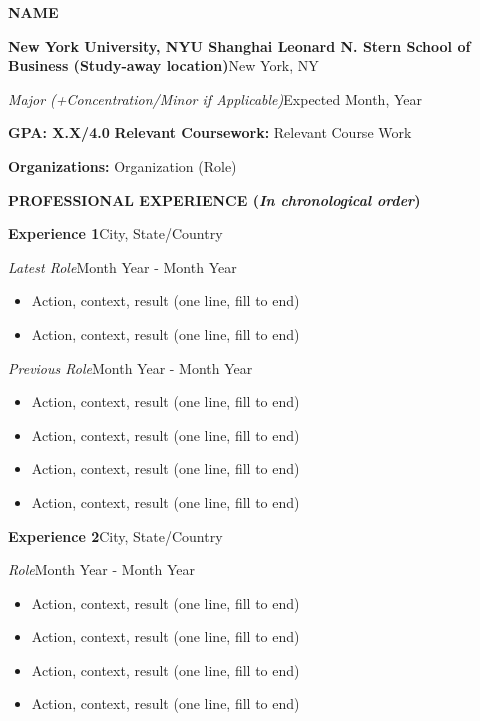 \documentclass[letterpaper]{article}
\newcommand{\bplus}{\par\vspace{2pt}}
\newcommand{\bighead}[1]{\par\vspace{6pt}{\fontsize{11.04}{12}\selectfont\textbf{#1}}\par}
\newcommand{\head}[1]{\par\vspace{4pt}\textbf{#1}\par}
\newcommand{\entry}[2]{\par\textbf{#1}\hfill #2\par}
\newcommand{\entryit}[2]{\par\textit{#1}\hfill #2\par}
\newenvironment{bull}{\begin{itemize}[leftmargin=13.6pt, itemsep=0pt, topsep=0pt, parsep=0pt, partopsep=0pt, label=\textbullet\,]}{\end{itemize}}
\begin{document}
{\centering
  {\fontsize{21.96}{22}\selectfont\textbf{NAME}}\par
  \par
}

\bighead{EDUCATION}
\entry{New York University, NYU Shanghai \textbar{} Leonard N. Stern School of Business (Study-away location)}{New York, NY}
\entryit{Major (+Concentration/Minor if Applicable)}{Expected Month, Year}
\par\textbf{GPA: X.X/4.0} \textbar{} \textbf{Relevant Coursework:} Relevant Course Work\par
\par\textbf{Organizations:} Organization (Role)\par

\head{\textbf{PROFESSIONAL EXPERIENCE} (\textit{In chronological order})}
\entry{Experience 1}{City, State/Country}
\entryit{Latest Role}{Month Year - Month Year}
\begin{bull}
  \item Action, context, result (one line, fill to end)
  \item Action, context, result (one line, fill to end)
\end{bull}
\entryit{Previous Role}{Month Year - Month Year}
\begin{bull}
  \item Action, context, result (one line, fill to end)
  \item Action, context, result (one line, fill to end)
  \bplus
  \item Action, context, result (one line, fill to end)
  \item Action, context, result (one line, fill to end)
\end{bull}

\entry{Experience 2}{City, State/Country}
\entryit{Role}{Month Year - Month Year}
\begin{bull}
  \item Action, context, result (one line, fill to end)
  \bplus
  \item Action, context, result (one line, fill to end)
  \item Action, context, result (one line, fill to end)
  \bplus
  \item Action, context, result (one line, fill to end)
\end{bull}
\end{document}
